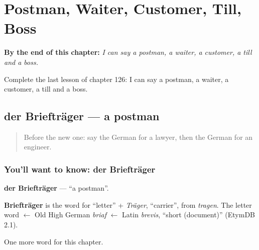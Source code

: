 
\chapter{Postman, Waiter, Customer, Till, Boss}
\label{ch:ge-postman-waiter-customer-till-boss}

\begin{chapteropening}
\textbf{By the end of this chapter:} \emph{I can say a postman, a waiter, a customer, a till and a boss.}

Complete the last lesson of chapter 126: I can say a postman, a waiter, a customer, a till and a boss.
\end{chapteropening}

\section[der Briefträger]{der Briefträger — a postman}

\label{lesson:GE-C126-brieftraeger}



\begin{quote}
Before the new one: say the German for a lawyer, then the German for an engineer.
\end{quote}

\subsection*{You'll want to know: der Briefträger}
\textbf{der Briefträger} — \textquotedblleft{}a postman\textquotedblright{}.

\begin{cousinweb}
\textbf{Briefträger} is the word for \textquotedblleft{}letter\textquotedblright{} + \emph{Träger}, \textquotedblleft{}carrier\textquotedblright{}, from \emph{tragen}. The letter word $\leftarrow$ Old High German \emph{briaf} $\leftarrow$ Latin \emph{brevis}, \textquotedblleft{}short (document)\textquotedblright{} (EtymDB 2.1).
\end{cousinweb}

\begin{grammarlens}[title={What you've built}]
One more word for this chapter.
\end{grammarlens}

